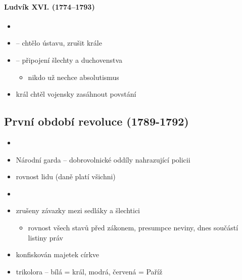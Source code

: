 \paragraph{Ludvík XVI. (1774--1793)}
\begin{itemize}
\item {}
\item {} -- chtělo ústavu, zrušit krále
\item {} -- připojení šlechty a duchovenstva
	\begin{itemize}
	\item nikdo už nechce absolutismus
	\end{itemize}
\item král chtěl vojensky zasáhnout \ra povstání
\end{itemize}

\subsection{První období revoluce (1789-1792)}
\begin{itemize}
\item {}
\item Národní garda -- dobrovolnické oddíly nahrazující policii 
\item {} \ra rovnost lidu (daně platí všichni)
\item {}
\item zrušeny závazky mezi sedláky a šlechtici
	\begin{itemize}
	\item rovnost všech stavů před zákonem, presumpce neviny, dnes součástí listiny práv
	\end{itemize}
\item konfiskován majetek církve
\item trikolora -- bílá = král, modrá, červená = Paříž
\end{itemize}

